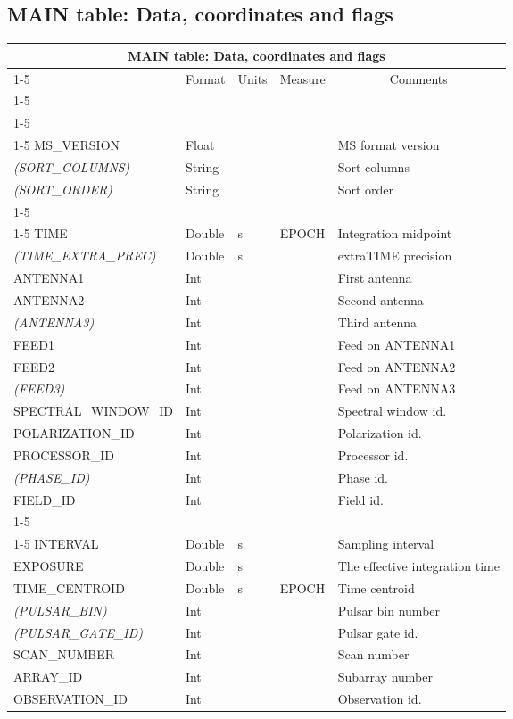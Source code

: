 \documentclass{article}
\newcommand{\defline}[1]{\cline{1-5}
\multicolumn{5}{|l|}{#1} \\
\cline{1-5}}
\newcommand{\definetable}[2]
{
	\vfill\newpage
	\subsection{#1}
        \vspace{0.15in}
        \small
	\begin{tabular}{|l|p{1.25in}|l|p{.9in}|p{1.4in}|}
	\hline
	\multicolumn{5}{|c|}{\bf #1}\\ 
	\cline{1-5}
        \multicolumn{1}{|c|}{Name}&\multicolumn{1}{|c|}{Format}&
        \multicolumn{1}{|c|}{Units}&\multicolumn{1}{|c|}{Measure}&
        \multicolumn{1}{|c|}{Comments}\\
        \cline{1-5}
        #2
        \hline
	\end{tabular}
}
\begin{document}
\definetable{MAIN table: Data, coordinates and flags}
{
\defline{\bf Columns}
\defline{\em Keywords}
MS\_VERSION   & Float  & & & MS format version \\
{\it (SORT\_COLUMNS)} & String & & & Sort columns \\  
{\it (SORT\_ORDER)}   & String & & & Sort order \\
\defline{\em Key}
TIME  &         Double  &      s   &     EPOCH    & Integration midpoint \\
{\it (TIME\_EXTRA\_PREC)} & Double & s       &     & extraTIME precision \\
ANTENNA1  &      Int    &          &              & First antenna \\
ANTENNA2  &      Int    &          &              & Second antenna \\
{\it (ANTENNA3)} & Int    &          &              & Third antenna \\
FEED1  &      Int       &          &              & Feed on ANTENNA1 \\
FEED2  &      Int       &          &              & Feed on ANTENNA2 \\
{\it (FEED3)} & Int       &          &              & Feed on ANTENNA3 \\
SPECTRAL\_WINDOW\_ID  &  Int   &          &        & Spectral window id.\\
POLARIZATION\_ID & Int & & & Polarization id.\\
PROCESSOR\_ID  & Int   &          &        & Processor id.\\
{\it (PHASE\_ID)} & Int &               &         & Phase id.\\
FIELD\_ID  &      Int   &          &        & Field id.\\
\defline{\em Non-key attributes}
INTERVAL  &      Double &       s  &      & Sampling interval \\
EXPOSURE  &      Double &       s  &      & The effective integration time \\
TIME\_CENTROID & Double &       s  &    EPOCH & Time centroid \\
{\it (PULSAR\_BIN)} & Int &          &      & Pulsar bin number \\
{\it (PULSAR\_GATE\_ID)} & Int &         &      & Pulsar gate id. \\   
SCAN\_NUMBER  &   Int   &          &      & Scan number  \\ 
ARRAY\_ID  &      Int   &          &      & Subarray number\\
OBSERVATION\_ID  & Int   &          &     & Observation id.\\
}
\end{document}
